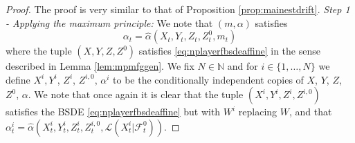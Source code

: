 \documentclass[11pt,reqno]{amsart}
\numberwithin{equation}{section}
\theoremstyle{definition}
\def\N{{\mathbb N}}
\newcommand{\sL}{\mathcal{L}}
\newcommand{\sF}{\mathcal{F}}
\def \N{\mathbb{N}}
\begin{document}
\begin{proof}
The proof is very similar to that of Proposition \ref{prop:mainestdrift}. 
\newline  \newline 
\textit{Step 1 - Applying the maximum principle:} We note that $(m,\alpha)$ satisfies
\begin{equation*}
  \alpha_t = \widehat{\alpha}(X_t,Y_t,Z_t,Z_t^0, m_t)
 \end{equation*} 
 where the tuple $(X,Y,Z,Z^{0}) $ satisfies \eqref{eq:nplayerfbsdeaffine}
in the sense described in Lemma \ref{lem:mpmfggen}. We fix $N \in \N$ and for $i \in \{1,\dots,N\}$ we define $X^i, Y^i$, $Z^i$, $Z^{i,0}$, $\alpha^i$ to be the conditionally independent copies of $X$, $Y$, $Z$, $Z^0$, $\alpha$. We note that once again it is clear that the tuple $(X^i,Y^i,Z^i,Z^{i,0})$ satisfies the BSDE \eqref{eq:nplayerfbsdeaffine} but with $W^i$ replacing $W$, and that $\alpha_t^i = \widehat{\alpha}(X_t^i,Y_t^i,Z_t^i,Z_t^{i,0}, \sL(X_t^i | \sF_t^0))$.


\end{proof}
\end{document}
